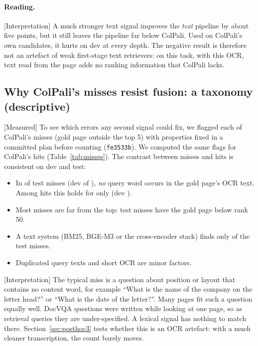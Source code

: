 \documentclass[11pt,a4paper]{article}
\newcommand{\lbl}[2]{\textsf{\scriptsize\textcolor{#1}{[#2]}}}
\newcommand{\Int}{\lbl{tagI}{Interpretation}}
\newcommand{\Mea}{\lbl{tagM}{Measured}}
\newcommand{\file}[1]{\texttt{\small\hyphenchar\font=`\/ #1}}
\begin{document}
\paragraph{Reading.} \Int{} A much stronger text signal improves the \emph{text} pipeline by about five points, but it still leaves the pipeline far below ColPali. Used on ColPali's own candidates, it hurts on dev at every depth. The negative result is therefore not an artefact of weak first-stage text retrievers: on this task, with this OCR, text read from the page adds no ranking information that ColPali lacks.

\subsection{Why ColPali's misses resist fusion: a taxonomy (descriptive)}
\label{sec:misses}
\Mea{} To see which errors any second signal could fix, we flagged each of ColPali's misses (gold page outside the top 5) with properties fixed in a committed plan before counting (\texttt{fe3533b}). We computed the same flags for ColPali's hits (Table~\ref{tab:misses}). The contrast between misses and hits is consistent on dev and test:
\begin{itemize}
  \item In \noOverlapMissTest{} of \missTest{} test misses (dev \noOverlapMissDev{} of \missDev{}), \emph{no} query word occurs in the gold page's OCR text. Among hits this holds for only \noOverlapHitTest{} (dev \noOverlapHitDev{}).
  \item Most misses are far from the top: \farMissTest{} test misses have the gold page below rank 50.
  \item A text system (BM25, BGE-M3 or the cross-encoder stack) finds only \textFindsTest{} of the test misses.
  \item Duplicated query texts and short OCR are minor factors.
\end{itemize}
\Int{} The typical miss is a question about position or layout that contains no content word, for example ``What is the name of the company on the letter head?'' or ``What is the date of the letter?''. Many pages fit such a question equally well. DocVQA questions were written while looking at one page, so as retrieval queries they are under-specified. A lexical signal has nothing to match there. Section~\ref{sec:posthoc3} tests whether this is an OCR artefact: with a much cleaner transcription, the count barely moves.

\begin{table}[!htbp]\centering\small

\caption{\Mea{} Flags of ColPali's misses vs hits (\file{results/miss\_taxonomy/}).}\label{tab:misses}
\end{table}
\end{document}
